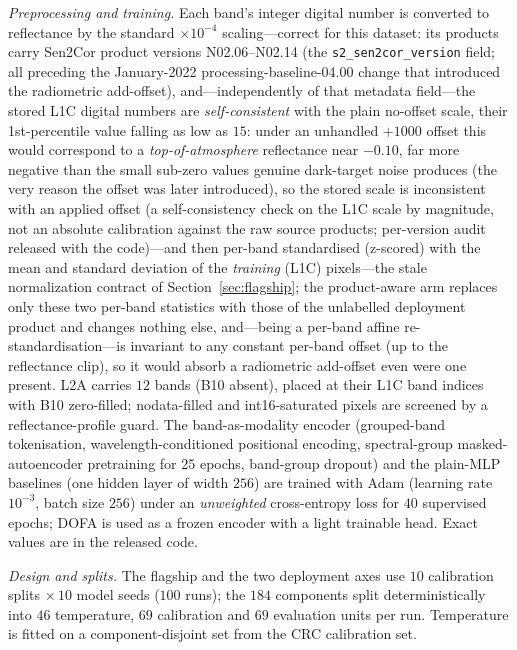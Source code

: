 \documentclass[preprint,3p,times]{elsarticle}
\begin{document}
\emph{Preprocessing and training.} Each band's integer digital number is converted to reflectance by the standard $\times 10^{-4}$ scaling---correct for this dataset: its products carry Sen2Cor product versions N02.06--N02.14 (the \texttt{s2\_sen2cor\_version} field; all preceding the January-2022 processing-baseline-04.00 change that introduced the radiometric add-offset), and---independently of that metadata field---the stored L1C digital numbers are \emph{self-consistent} with the plain no-offset scale, their 1st-percentile value falling as low as $15$: under an unhandled $+1000$ offset this would correspond to a \emph{top-of-atmosphere} reflectance near $-0.10$, far more negative than the small sub-zero values genuine dark-target noise produces (the very reason the offset was later introduced), so the stored scale is inconsistent with an applied offset (a self-consistency check on the L1C scale by magnitude, not an absolute calibration against the raw source products; per-version audit released with the code)---and then per-band standardised (z-scored) with the mean and standard deviation of the \emph{training} (L1C) pixels---the stale normalization contract of Section~\ref{sec:flagship}; the product-aware arm replaces only these two per-band statistics with those of the unlabelled deployment product and changes nothing else, and---being a per-band affine re-standardisation---is invariant to any constant per-band offset (up to the reflectance clip), so it would absorb a radiometric add-offset even were one present. L2A carries $12$ bands (B10 absent), placed at their L1C band indices with B10 zero-filled; nodata-filled and int16-saturated pixels are screened by a reflectance-profile guard. The band-as-modality encoder (grouped-band tokenisation, wavelength-conditioned positional encoding, spectral-group masked-autoencoder pretraining for $25$ epochs, band-group dropout) and the plain-MLP baselines (one hidden layer of width $256$) are trained with Adam (learning rate $10^{-3}$, batch size $256$) under an \emph{unweighted} cross-entropy loss for $40$ supervised epochs; DOFA is used as a frozen encoder with a light trainable head. Exact values are in the released code.

\emph{Design and splits.} The flagship and the two deployment axes use $10$ calibration splits $\times\,10$ model seeds ($100$ runs); the $184$ components split deterministically into $46$ temperature, $69$ calibration and $69$ evaluation units per run. Temperature is fitted on a component-disjoint set from the CRC calibration set.
\end{document}
